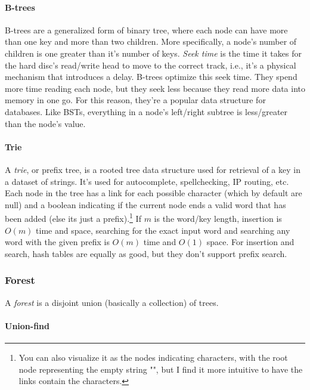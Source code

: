 \documentclass[8pt, table, xcdraw]{article}%
\begin{document}
\paragraph{B-trees}

B-trees are a generalized form of binary tree, where each node can have more than one key and more than two children. More specifically, a node's number of children is one greater than it's number of keys. \emph{Seek time} is the time it takes for the hard disc's read/write head to move to the correct track, i.e., it's a physical mechanism that introduces a delay. B-trees optimize this seek time. They spend more time reading each node, but they seek less because they read more data into memory in one go. For this reason, they're a popular data structure for databases. Like BSTs, everything in a node's left/right subtree is less/greater than the node's value.

\paragraph{Trie}

A \emph{trie}, or prefix tree, is a rooted tree data structure used for retrieval of a key in a dataset of strings. It's used for autocomplete, spellchecking, IP routing, etc. Each node in the tree has a link for each possible character (which by default are null) and a boolean indicating if the current node ends a valid word that has been added (else its just a prefix).\footnote{You can also visualize it as the nodes indicating characters, with the root node representing the empty string "", but I find it more intuitive to have the links contain the characters.} If $m$ is the word/key length, insertion is $O(m)$ time and space, searching for the exact input word and searching any word with the given prefix is $O(m)$ time and $O(1)$ space. For insertion and search, hash tables are equally as good, but they don't support prefix search.

\subsubsection{Forest}

A \emph{forest} is a disjoint union (basically a collection) of trees.

\paragraph{Union-find}
\end{document}
